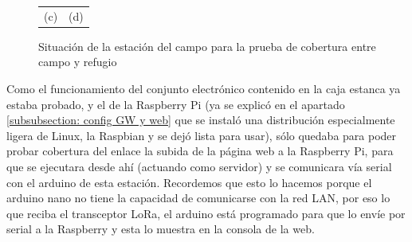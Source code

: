 \documentclass[12pt]{article}
\begin{document}
\begin{figure}[h!]
\begin{center}
\begin{tabular}{cc}
				(c)  & (d)  \\[6pt]
			\end{tabular}
			\caption{Situación de la estación del campo para la prueba de cobertura entre campo y refugio}
			\label{Pruebas: estacion campo}
		\end{center}	
	\end{figure}

	\noindent Como el funcionamiento del conjunto electrónico contenido en la caja estanca ya estaba probado, y el de la Raspberry Pi (ya se explicó en el apartado \ref{subsubsection: config GW y web} que se instaló una distribución especialmente ligera de Linux, la Raspbian y se dejó lista para usar), sólo quedaba para poder probar cobertura del enlace la subida de la página web a la Raspberry Pi, para que se ejecutara desde ahí (actuando como servidor) y se comunicara vía serial con el arduino de esta estación. Recordemos que esto lo hacemos porque el arduino nano no tiene la capacidad de comunicarse con la red LAN, por eso lo que reciba el transceptor LoRa, el arduino está programado para que lo envíe por serial a la Raspberry y esta lo muestra en la consola de la web. \\
	
	\pagebreak
	
\end{document}
